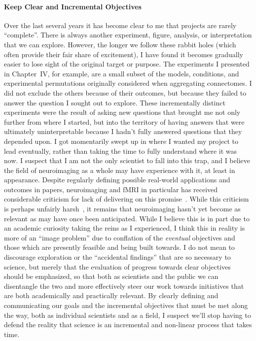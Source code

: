 \paragraph*{Keep Clear and Incremental Objectives}
Over the last several years it has become clear to me that projects are rarely ``complete''. There is always
another experiment, figure, analysis, or interpretation that we can explore. However, the longer we follow these
rabbit holes (which often provide their fair share of excitement), I have found it becomes gradually easier to lose
sight of the original target or purpose. The experiments I presented in Chapter~IV, for example, are a small
subset of the models, conditions, and experimental permutations originally considered when aggregating connectomes.
I did not exclude the others because of their outcomes, but because they failed to answer the question I sought out
to explore. These incrementally distinct experiments were the result of asking new questions that brought me not
only further from where I started, but into the territory of having answers that were ultimately uninterpretable
because I hadn't fully answered questions that they depended upon. I got momentarily swept up in where I wanted my
project to lead eventually, rather than taking the time to fully understand where it was now. I suspect that I am
not the only scientist to fall into this trap, and I believe the field of neuroimaging as a whole may have
experience with it, at least in appearance. Despite regularly defining possible real-world applications and outcomes
in papers, neuroimaging and fMRI in particular has received considerable criticism for lack of delivering on this
promise~\cite{robinson2004fmri}. While this criticism is perhaps unfairly harsh~\cite{lyon2017dead}, it remains that
neuroimaging hasn't yet become as relevant as may have once been anticipated. While I believe this is in part due to
an academic curiosity taking the reins as I experienced, I think this in reality is more of an ``image problem'' due
to conflation of the \textit{eventual} objectives and those which are presently feasible and being built towards. I
do not mean to discourage exploration or the ``accidental findings'' that are so necessary to science, but merely
that the evaluation of progress towards clear objectives should be emphasized, so that both as scientists and the
public we can disentangle the two and more effectively steer our work towards initiatives that are both academically
and practically relevant. By clearly defining and communicating our goals and the incremental objectives that must be
met along the way, both as individual scientists and as a field, I suspect we'll stop having to defend the reality
that science is an incremental and non-linear process that takes time. 

